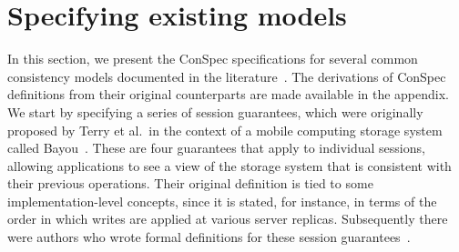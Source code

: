 \documentclass[journal,compsoc]{IEEEtran}
\begin{document}
 \section{Specifying existing models}\label{sec:list}
In this section, we present the ConSpec specifications for several common consistency models  documented in the literature~\cite{Chockler2000, Terry:1994:SGW:645792.668302, Burckhardt:2014:PEC:2693641.2693642}. The derivations of  ConSpec definitions from their original counterparts are made available in the appendix. %
We start by specifying a series of session guarantees, which were originally proposed by Terry et al.\ in the context of a mobile computing storage system called Bayou~\cite{Terry:1994:SGW:645792.668302}. These are four guarantees that apply to individual sessions, allowing applications to see a view of the storage system that is consistent with their previous operations. Their original definition is tied to some implementation-level concepts, since it is stated, for instance, in terms of the order in which writes are applied at various server replicas. Subsequently there were authors who wrote formal definitions for these session guarantees~\cite{Chockler2000, Burckhardt:2014:PEC:2693641.2693642}. 
\end{document}
